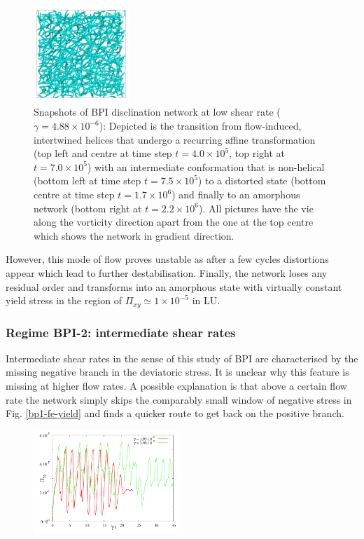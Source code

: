 \documentclass[aps,pre,reprint,superscriptaddress, twocolumn]{revtex4}
\newcommand{\e}[1]{\times10^{#1}}
\begin{document}
\begin{figure}[htpb]
\includegraphics[width=0.32\textwidth]{disc-xy-2200k_run1115.png}
\caption{Snapshots of BPI disclination network at low shear rate ($\dot{\gamma}=4.88\e{-6}$): Depicted is the transition from flow-induced, intertwined helices that undergo a recurring affine transformation (top left and centre at time step $t=4.0\e{5}$, top right at $t=7.0\e{5}$) with an intermediate conformation that is non-helical (bottom left at time step $t=7.5\e{5}$) to a distorted state (bottom centre at time step $t=1.7\e{6}$) and finally to an amorphous network (bottom right at $t=2.2\e{6}$). All pictures have the vie along the vorticity direction apart from the one at the top centre which shows the network in gradient direction.}
\label{bp1-low}
\end{figure}

However, this mode of flow proves unstable as after a few cycles 
distortions appear which lead to further destabilisation.
Finally, the network loses any residual order and 
transforms into an amorphous state with virtually constant
yield stress in the region of $\Pi_{xy}\simeq 1\e{-5}$ in LU.

\subsubsection{Regime BPI-2: intermediate shear rates}

Intermediate shear rates in the sense of this study of BPI are characterised 
by the missing negative branch in the deviatoric stress. It is unclear 
why this feature is missing at higher flow rates. A possible explanation is that 
above a certain flow rate the network simply skips the comparably small 
window of negative stress in Fig. \ref{bp1-fe-yield} and finds a quicker 
route to get back on the positive branch.

\begin{figure}[htpb]
\includegraphics[width=0.495\textwidth]{stress_bp1-1_bp1-2.pdf}
\caption{}
\label{bp1-1_bp1-2}
\end{figure}
\end{document}
